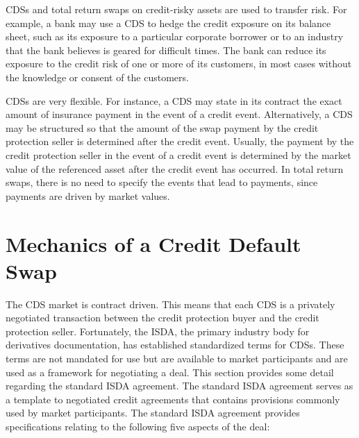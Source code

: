 \documentclass[11pt]{article}
\begin{document}
CDSs and total return swaps on credit-risky assets are used to transfer risk. For example, a bank may use a CDS to hedge the credit exposure on its balance sheet, such as its exposure to a particular corporate borrower or to an industry that the bank believes is geared for difficult times. The bank can reduce its exposure to the credit risk of one or more of its customers, in most cases without the knowledge or consent of the customers.

CDSs are very flexible. For instance, a CDS may state in its contract the exact amount of insurance payment in the event of a credit event. Alternatively, a CDS may be structured so that the amount of the swap payment by the credit protection seller is determined after the credit event. Usually, the payment by the credit protection seller in the event of a credit event is determined by the market value of the referenced asset after the credit event has occurred. In total return swaps, there is no need to specify the events that lead to payments, since payments are driven by market values.

\section*{Mechanics of a Credit Default Swap}
The CDS market is contract driven. This means that each CDS is a privately negotiated transaction between the credit protection buyer and the credit protection seller. Fortunately, the ISDA, the primary industry body for derivatives documentation, has established standardized terms for CDSs. These terms are not mandated for use but are available to market participants and are used as a framework for negotiating a deal. This section provides some detail regarding the standard ISDA agreement. The standard ISDA agreement serves as a template to negotiated credit agreements that contains provisions commonly used by market participants. The standard ISDA agreement provides specifications relating to the following five aspects of the deal:
\end{document}
